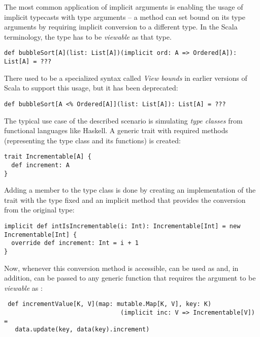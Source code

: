 The most common application of implicit arguments is enabling the usage of implicit typecasts with type arguments -- a method can set bound on its type arguments by requiring implicit conversion to a different type. In the Scala terminology, the type has to be \textit{viewable} as that type.

\lstset{style=Scala}
\begin{lstlisting}
def bubbleSort[A](list: List[A])(implicit ord: A => Ordered[A]): List[A] = ???
\end{lstlisting}

There used to be a specialized syntax called \textit{View bounds} in earlier versions of Scala to support this usage, but it has been deprecated:

\lstset{style=Scala}
\begin{lstlisting}
def bubbleSort[A <% Ordered[A]](list: List[A]): List[A] = ???
\end{lstlisting}

The typical use case of the described scenario is simulating \textit{type classes} from functional languages like Haskell. A generic trait with required methods (representing the type class and its functions) is created:

\lstset{style=Scala}
\begin{lstlisting}
trait Incrementable[A] {
  def increment: A
}
\end{lstlisting}

 Adding a member to the type class is done by creating an implementation of the trait with the type fixed and an implicit method that provides the conversion from the original type:
 
 \lstset{style=Scala}
 \begin{lstlisting}
implicit def intIsIncrementable(i: Int): Incrementable[Int] = new Incrementable[Int] {
  override def increment: Int = i + 1
}
 \end{lstlisting}
 
 Now, whenever this conversion method is accessible,  can be used as  and, in addition, can be passed to any generic function that requires the argument to be \textit{viewable} as :
 
  \lstset{style=Scala}
 \begin{lstlisting}
 def incrementValue[K, V](map: mutable.Map[K, V], key: K)
                                (implicit inc: V => Incrementable[V]) =
   data.update(key, data(key).increment)
  \end{lstlisting}
  
